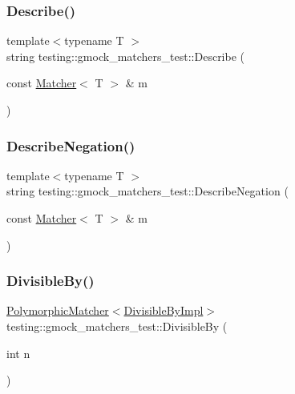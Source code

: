 \subsubsection{\texorpdfstring{Describe()}{Describe()}}
{\footnotesize\ttfamily template$<$typename T $>$ \\
string testing\+::gmock\+\_\+matchers\+\_\+test\+::\+Describe (\begin{DoxyParamCaption}\item[{const \hyperlink{classtesting_1_1_matcher}{Matcher}$<$ T $>$ \&}]{m }\end{DoxyParamCaption})}

\mbox{\label{namespacetesting_1_1gmock__matchers__test_afbc8022da5a58aa467ec414ab3e90908}} 
\subsubsection{\texorpdfstring{Describe\+Negation()}{DescribeNegation()}}
{\footnotesize\ttfamily template$<$typename T $>$ \\
string testing\+::gmock\+\_\+matchers\+\_\+test\+::\+Describe\+Negation (\begin{DoxyParamCaption}\item[{const \hyperlink{classtesting_1_1_matcher}{Matcher}$<$ T $>$ \&}]{m }\end{DoxyParamCaption})}

\mbox{\label{namespacetesting_1_1gmock__matchers__test_ac5b1fd3b6a8141c7e83ef6040ed4630f}} 
\subsubsection{\texorpdfstring{Divisible\+By()}{DivisibleBy()}}
{\footnotesize\ttfamily \hyperlink{classtesting_1_1_polymorphic_matcher}{Polymorphic\+Matcher}$<$\hyperlink{classtesting_1_1gmock__matchers__test_1_1_divisible_by_impl}{Divisible\+By\+Impl}$>$ testing\+::gmock\+\_\+matchers\+\_\+test\+::\+Divisible\+By (\begin{DoxyParamCaption}\item[{int}]{n }\end{DoxyParamCaption})}

